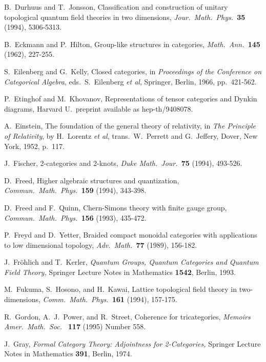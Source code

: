 \begin{thebibliography}{10}
 B.\ Durhuus and T.\ Jonsson, Classification and 
construction of unitary topological quantum field theories
in two dimensions, {\sl Jour.\ Math.\ Phys.\ }{\bf 35} (1994),
5306-5313.

 B.\ Eckmann and P.\ Hilton, Group-like structures in categories,
{\sl Math.\ Ann.\ }{\bf 145} (1962), 227-255.

 S.\ Eilenberg and G.\ Kelly, Closed categories,  in
{\sl Proceedings of the Conference on Categorical Algebra}, eds.\
S.\ Eilenberg {\it et al}, Springer, Berlin, 1966, pp.\
421-562.

 P.\ Etinghof and M.\ Khovanov, Representations of
tensor categories and Dynkin diagrams, Harvard U.\ preprint
available as hep-th/9408078.

 A.\ Einstein, The foundation of the general
theory of relativity, in {\sl The Principle of Relativity}, by
H.\ Lorentz {\it et al}, trans.\ W.\ Perrett and G.\
Jeffery, Dover, New York, 1952, p.\ 117.

\bibitem{Fischer} J.\ Fischer, 2-categories
and 2-knots, {\sl Duke Math.\ Jour.\ }{\bf 75} (1994), 493-526.  

\bibitem{Freed} D.\ Freed,
Higher algebraic structures and quantization, {\sl Commun.\
Math.\ Phys.\ }{\bf 159} (1994), 343-398.

\bibitem{FQ} D.\ Freed and F.\ Quinn, Chern-Simons theory with
finite gauge group, {\sl Commun.\ Math.\ Phys.\ }{\bf 156}
(1993), 435-472.

\bibitem{FY} P.\ Freyd and D.\ Yetter, Braided compact monoidal
categories with applications to low dimensional topology, {\sl
Adv.\ Math.\ }{\bf 77} (1989), 156-182.

\bibitem{FK} J.\ Fr\"ohlich and T.\ Kerler, {\sl Quantum Groups,
Quantum Categories and Quantum Field Theory,} Springer Lecture
Notes in Mathematics {\bf 1542}, Berlin, 1993.

\bibitem{FHK} M.\ Fukuma, S.\ Hosono, and H.\ Kawai,
Lattice topological field theory in two-dimensions,
{\sl Comm.\ Math.\ Phys.\ }{\bf 161} (1994), 157-175.

\bibitem{GPS} R.\ Gordon, A.\ J.\ Power, and R.\ Street,
Coherence for tricategories, 
{\sl Memoirs Amer.\ Math.\  Soc.\ } {\bf 117} (1995) Number 558.  

\bibitem{Gray} J.\ Gray, {\sl Formal Category Theory: Adjointness
for 2-Categories,} Springer Lecture Notes in Mathematics {\bf 391},
Berlin, 1974.


\end{thebibliography}
